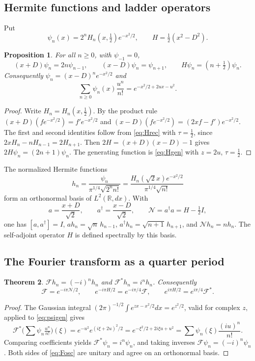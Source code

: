 \documentclass[11pt,reqno]{amsart}
\newtheorem{theorem}{Theorem}[section]
\newtheorem{proposition}[theorem]{Proposition}
\theoremstyle{definition}
\theoremstyle{remark}
\newcommand{\R}{\mathbb R}
\newcommand{\F}{\mathcal F}
\newcommand{\NN}{\mathcal N}
\newcommand{\Id}{I}
\begin{document}
\subsection{Hermite functions and ladder operators}
Put
\[
\psi_n(x)=2^nH_n(x,\tfrac12)e^{-x^2/2},\qquad
H=\tfrac12(x^2-D^2).
\]
\begin{proposition}\label{prop:ladder}
For all $n\ge0$, with $\psi_{-1}=0$,
\[
(x+D)\psi_n=2n\psi_{n-1},\qquad
(x-D)\psi_n=\psi_{n+1},\qquad
H\psi_n=(n+\tfrac12)\psi_n.
\]
Consequently $\psi_n=(x-D)^ne^{-x^2/2}$ and
\begin{equation}\label{eq:psigen}
\sum_{n\ge0}\psi_n(x)\frac{u^n}{n!}=e^{-x^2/2+2ux-u^2}.
\end{equation}
\end{proposition}
\begin{proof}
Write $H_n=H_n(x,\frac12)$. By the product rule
$(x+D)(f e^{-x^2/2})=f'e^{-x^2/2}$ and
$(x-D)(fe^{-x^2/2})=(2xf-f')e^{-x^2/2}$. The first and second
identities follow from \eqref{eq:Hrec} with $\tau=\frac12$, since
$2xH_n-nH_{n-1}=2H_{n+1}$. Then
$2H=(x+D)(x-D)-1$ gives $2H\psi_n=(2n+1)\psi_n$.
The generating function is \eqref{eq:Hgen} with $z=2u$, $\tau=\frac12$.
\end{proof}

The normalized Hermite functions
\[
h_n=\frac{\psi_n}{\pi^{1/4}\sqrt{2^nn!}}
=\frac{H_n(\sqrt2x)e^{-x^2/2}}{\pi^{1/4}\sqrt{n!}}
\]
form an orthonormal basis of $L^2(\R,dx)$. With
\[
a=\frac{x+D}{\sqrt2},\qquad a^\dagger=\frac{x-D}{\sqrt2},\qquad
\NN=a^\dagger a=H-\tfrac12\Id,
\]
one has $[a,a^\dagger]=\Id$, $ah_n=\sqrt n\,h_{n-1}$,
$a^\dagger h_n=\sqrt{n+1}\,h_{n+1}$, and $\NN h_n=nh_n$.
The self-adjoint operator $H$ is defined spectrally by this basis.

\subsection{The Fourier transform as a quarter period}
\begin{theorem}\label{thm:fourier}
$\F h_n=(-i)^nh_n$ and $\F^*h_n=i^nh_n$. Consequently
\begin{equation}\label{eq:Fosc}
\F=e^{-i\pi\NN/2},\qquad
e^{-i\pi H/2}=e^{-i\pi/4}\F,\qquad
e^{i\pi H/2}=e^{i\pi/4}\F^*.
\end{equation}
\end{theorem}
\begin{proof}
The Gaussian integral
$(2\pi)^{-1/2}\int e^{zx-x^2/2}dx=e^{z^2/2}$, valid for complex $z$,
applied to \eqref{eq:psigen} gives
\[
\F^*\Big(\sum\psi_n\tfrac{u^n}{n!}\Big)(\xi)
=e^{-u^2}e^{(i\xi+2u)^2/2}=e^{-\xi^2/2+2i\xi u+u^2}
=\sum\psi_n(\xi)\frac{(iu)^n}{n!}.
\]
Comparing coefficients yields $\F^*\psi_n=i^n\psi_n$, and taking
inverses $\F\psi_n=(-i)^n\psi_n$. Both sides of \eqref{eq:Fosc} are
unitary and agree on an orthonormal basis.
\end{proof}
\end{document}
